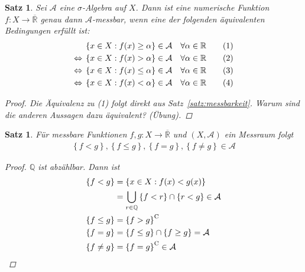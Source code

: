 \documentclass[11pt, twoside, a4paper]{article}
\theoremstyle{plain}
\newtheorem{satz}[blockelement]{Satz}
\numberwithin{equation}{subsection}
\newcommand{\set}[1]{\left\{#1\right\}}
\newcommand{\pair}[1]{\left(#1\right)}
\newcommand{\of}[1]{\mathopen{}\mathclose{}\bgroup\left(#1\aftergroup\egroup\right)}
\newcommand{\equivalent}[0]{\Leftrightarrow{}}
\newcommand{\comp}[1]{{#1}^{\mathrm{C}}}
\newcommand{\R}{\mathbb{R}}
\newcommand{\Q}{\mathbb{Q}}
\newcommand{\mA}{\mathcal{A}}
\begin{document}
    \begin{satz}
        Sei $\mA$ eine $\sigma$-Algebra auf $X$. Dann ist eine numerische Funktion $f: X\to\overline{\R}$ genau dann $\mA$-messbar, wenn eine der folgenden äquivalenten Bedingungen erfüllt ist:
        \begin{align*}
            &\set{x\in X: f\of{x} \geq \alpha} \in\mA\quad\forall \alpha\in\R\tag{1}\\
            \equivalent &\set{x\in X: f\of{x} > \alpha} \in\mA\quad\forall \alpha\in\R\tag{2}\\
            \equivalent &\set{x\in X: f\of{x} \leq \alpha} \in\mA\quad\forall \alpha\in\R\tag{3}\\
            \equivalent &\set{x\in X: f\of{x} < \alpha} \in\mA\quad\forall \alpha\in\R\tag{4}
        \end{align*}

        \begin{proof}
            Die Äquivalenz zu (1) folgt direkt aus Satz~\ref{satz:messbarkeit}. Warum sind die anderen Aussagen dazu äquivalent? (Übung).
        \end{proof}
    \end{satz}

    \begin{satz}
        \label{satz:messbarkeit-1}
        Für messbare Funktionen $f, g: X \to \overline{\R}$ und $\pair{X, \mA}$ ein Messraum folgt
        \begin{align*}
            \set{f < g}, \set{f \leq g}, \set{f = g}, \set{f \neq g} \in\mA
        \end{align*}
        \begin{proof}
            $\Q$ ist abzählbar. Dann ist
            \begin{align*}
                \set{f < g} &= \set{x\in X: f\of{x} < g\of{x}}\\
                &= \bigcup_{r\in\Q} \set{f < r} \cap \set{r < g} \in\mA\\
                \set{f \leq g} &= \comp{\set{f > g}}\\
                \set{f = g} &= \set{f\leq g} \cap \set{f\geq g} = \mA\\
                \set{f\neq g} &= \comp{\set{f = g}} \in \mA\qedhere
            \end{align*}
        \end{proof}
    \end{satz}
\end{document}
